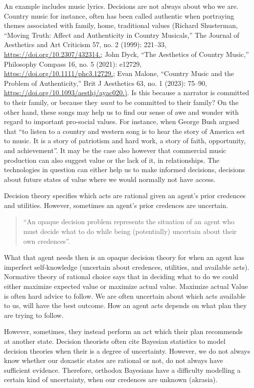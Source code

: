 \documentclass[
  letterpaper,
  DIV=11,
  numbers=noendperiod]{scrartcl}
\begin{document}
An example includes music lyrics. Decisions are not always about who we
are. Country music for instance, often has been called authentic when
portraying themes associated with family, home, traditional values
(Richard Shusterman, ``Moving Truth: Affect and Authenticity in Country
Musicals,'' The Journal of Aesthetics and Art Criticism 57, no. 2
(1999): 221--33, \url{https://doi.org/10.2307/432314.;} John Dyck, ``The
Aesthetics of Country Music,'' Philosophy Compass 16, no. 5 (2021):
e12729, \url{https://doi.org/10.1111/phc3.12729.;} Evan Malone,
``Country Music and the Problem of Authenticity,'' Brit J Aesthetics 63,
no. 1 (2023): 75--90, \url{https://doi.org/10.1093/aesthj/ayac020.)}. Is
this because a narrator is committed to their family, or because they
\emph{want} to be committed to their family? On the other hand, these
songs may help us to find our sense of awe and wonder with regard to
important pro-social values. For instance, when George Bush argued that
``to listen to a country and western song is to hear the story of
America set to music. It is a story of patriotism and hard work, a story
of faith, opportunity, and achievement''. It may be the case also
however that commercial music production can also suggest value or the
lack of it, in relationships. The technologies in question can either
help us to make informed decisions, decisions about future states of
value where we would normally not have access.

Decision theory specifies which acts are rational given an agent's prior
credences and utilities. However, sometimes an agent's prior credences
are uncertain.

\begin{quote}
``An opaque decision problem represents the situation of an agent who
must decide what to do while being (potentially) uncertain about their
own credences''.
\end{quote}

What that agent needs then is an opaque decision theory for when an
agent has imperfect self-knowledge (uncertain about credences,
utilities, and available acts). Normative theory of rational choice says
that in deciding what to do we could either maximize expected value or
maximize actual value. Maximize actual Value is often hard advice to
follow. We are often uncertain about which acts available to us, will
have the best outcome. How an agent acts depends on what plan they are
trying to follow.

However, sometimes, they instead perform an act which their plan
recommends at another state. Decision theorists often cite Bayesian
statistics to model decision theories when their is a degree of
uncertainty. However, we do not always know whether our doxastic states
are rational or not, do not always have sufficient evidence. Therefore,
orthodox Bayesians have a difficulty modelling a certain kind of
uncertainty, when our credences are unknown (akrasia).
\end{document}
